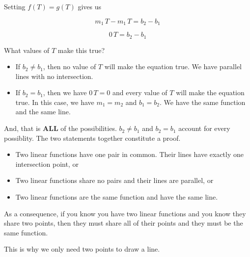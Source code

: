 \documentclass{ximera}
\begin{document}
\begin{explanation}
Setting $f(T) = g(T)$ gives us 



\[     m_1 \, T - m_1 \, T =  b_2 - b_1 \]


\[     0 \, T =  b_2 - b_1 \]


What values of $T$ make this true?


\begin{itemize}
\item If $b_2 \ne b_1$, then no value of $T$ will make the equation true.  We have parallel lines with no intersection.

\item If $b_2 = b_1$, then we have $0 \, T =  0$ and every value of $T$ will make the equation true.  In this case, we have $m_1 = m_2$ and $b_1 = b_2$.  We have the same function and the same line.
\end{itemize}



And, that is \textbf{\textcolor{purple!85!blue}{ALL}} of the possibilities.  $b_2 \ne b_1$ and  $b_2 = b_1$ account for every possiblity.  The two statements together constitute a proof.


\begin{itemize}
\item Two linear functions have one pair in common. Their lines have exactly one intersection point, or

\item Two linear functions share no pairs and their lines are parallel, or

\item Two linear functions are the same function and have the same line.



\end{itemize}





\end{explanation}


As a consequence, if you know you have two linear functions and you know they share two points, then they must share all of their points and they must be the same function.   

This is why we only need two points to draw a line.
\end{document}
